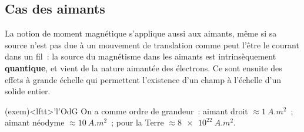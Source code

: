 \documentclass[../../main/main.tex]{subfiles}
\begin{document}
\subsection{Cas des aimants}
\label{ssec:magaim}
La notion de moment magnétique s'applique aussi aux aimants, même si sa source
n'est pas due à un mouvement de translation comme peut l'être le courant dans un
fil~: la source du magnétisme dans les aimants est intrinsèquement
\textbf{quantique}, et vient de la nature aimantée des électrons. Ce sont
ensuite des effets à grande échelle qui permettent l'existence d'un champ à
l'échelle d'un solide entier.

\begin{tcb}(exem)<lftt>'l'{OdG}
	On a comme ordre de grandeur~: aimant droit $\approx \SI{1}{A.m^2}$~; aimant
	néodyme $\approx \SI{10}{A.m^2}$~; pour la Terre $\approx \SI{8e22}{A.m^2}$.
\end{tcb}
\end{document}
